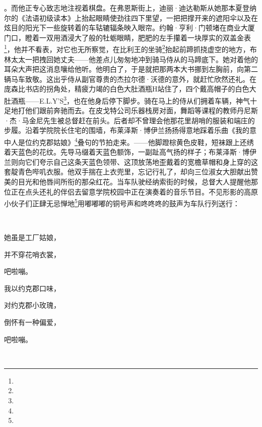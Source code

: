 。而他正专心致志地注视着棋盘。在弗恩斯街上，迪丽·迪达勒斯从她那本夏登纳尔的《法语初级读本》上抬起眼睛使劲往四下里望，一把把撑开来的遮阳伞以及在炫目的阳光下一些旋转着的车轱辘辐条映入眼帘。约翰·亨利·门顿堵在商业大厦门口，瞪着一双用酒浸大了般的牡蛎眼睛，肥肥的左手攥着一块厚实的双盖金表\footnote{}，他并不看表，对它也无所察觉，在比利王的坐骑\footnote{}抬起前蹄抓挠虚空的地方，布林太太一把拽回她丈夫——他差点儿匆匆地冲到骑马侍从的马蹄底下。她对着他的耳朵大声把这消息嚷给他听。他明白了，于是就把那两本大书挪到左胸前，向第二辆马车致敬。这出乎侍从副官尊贵的杰拉尔德·沃德的意外，就赶忙欣然还礼。在庞森比书店的拐角处，精疲力竭的白色大肚酒瓶H站住了，四个戴高帽子的白色大肚酒瓶——E.L.Y’S\footnote{}，也在他身后停下脚步。骑在马上的侍从们拥着车辆，神气十足地打他们跟前奔驰而去。在皮戈特公司乐器栈房对面，舞蹈等课程的教师丹尼斯·杰·马金尼先生被总督赶在前头。后者却不曾理会他那花里胡哨的服装和端庄的步履。沿着学院院长住宅的围墙，布莱泽斯·博伊兰扬扬得意地踩着乐曲《我的意中人是位约克郡姑娘》\footnote{}叠句的节拍走来。——他脚蹬棕黄色皮鞋，短袜跟上还绣着天蓝色的花纹。先导马缀着天蓝色额饰，一副趾高气扬的样子；布莱泽斯·博伊兰则向它们夸示自己这条天蓝色领带、这顶放荡地歪戴着的宽檐草帽和身上穿的这套靛青色哔叽衣服。他双手揣在上衣兜里，忘记行礼了，却向三位淑女大胆献出赞美的目光和他唇间所衔的那朵红花。当车队驶经纳索街的时候，总督大人提醒他那位正在点头还礼的伴侣去留意学院校园中正在演奏着的音乐节目。不见形影的高原小伙子们正肆无忌惮地\footnote{}用嘟嘟嘟的铜号声和咚咚咚的鼓声为车队行列送行：
\par  
\par 她虽是工厂姑娘，
\par 并不穿花哨衣裳，
\par 吧啦嘣。
\par 我以约克郡口味，
\par 对约克郡小玫瑰，
\par 倒怀有一种偏爱，
\par 吧啦嘣。
\par  
